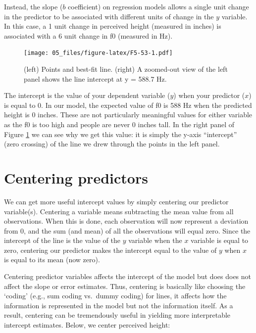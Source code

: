 \documentclass[
]{book}
\begin{document}
Instead, the slope (\(b\) coefficient) on regression models allows a single unit change in the predictor to be associated with different units of change in the \(y\) variable. In this case, a 1 unit change in perceived height (measured in inches) is associated with a 6 unit change in f0 (measured in Hz).

\begin{figure}
\centering
\texttt{[image: 05\_files/figure-latex/F5-53-1.pdf]}
\caption{\label{fig:F5-53}(left) Points and best-fit line. (right) A zoomed-out view of the left panel shows the line intercept at y = 588.7 Hz.}
\end{figure}

The intercept is the value of your dependent variable (\(y\)) when your predictor (\(x\)) is equal to 0. In our model, the expected value of f0 is 588 Hz when the predicted height is 0 inches. These are not particularly meaningful values for either variable as the f0 is too high and people are never 0 inches tall. In the right panel of Figure \ref{fig:F5-53} we can see why we get this value: it is simply the y-axis ``intercept'' (zero crossing) of the line we drew through the points in the left panel.

\hypertarget{centering-predictors}{%
\section{Centering predictors}\label{centering-predictors}}

We can get more useful intercept values by simply centering our predictor variable(s). Centering a variable means subtracting the mean value from all observations. When this is done, each observation will now represent a deviation from 0, and the sum (and mean) of all the observations will equal zero. Since the intercept of the line is the value of the \(y\) variable when the \(x\) variable is equal to zero, centering our predictor makes the intercept equal to the value of \(y\) when \(x\) is equal to its mean (now zero).

Centering predictor variables affects the intercept of the model but does does not affect the slope or error estimates. Thus, centering is basically like choosing the `coding' (e.g., sum coding vs.~dummy coding) for lines, it affects how the information is represented in the model but not the information itself. As a result, centering can be tremendously useful in yielding more interpretable intercept estimates. Below, we center perceived height:
\end{document}
